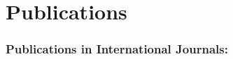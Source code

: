 %
%

\noquote
\orgchpos
\chapter*{Publications}
\label{publications}

\small
\normalsize

\subsection*{Publications in International Journals:}
\vspace{1ex}
%
%
%
%


